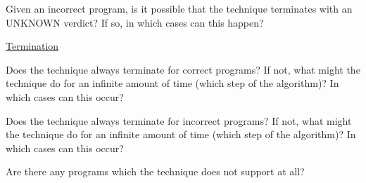 \documentclass[a4paper]{article}
\begin{document}
\begin{minipage}[t]{0.16\linewidth}
\begin{betterlist}
\begin{betterlist}
\begin{betterlist}
				\item Given an incorrect program, is it possible that the technique terminates with an UNKNOWN verdict? If so, in which cases can this happen?

			\end{betterlist}
			\item \underline{Termination}
			\begin{betterlist}
				\item Does the technique always terminate for correct programs? If not, what might the technique do for an infinite amount of time (which step of the algorithm)? In which cases can this occur?

				\item Does the technique always terminate for incorrect programs? If not, what might the technique do for an infinite amount of time (which step of the algorithm)? In which cases can this occur?

			\end{betterlist}
			\item Are there any programs which the technique does not support at all?


\end{betterlist}
\end{betterlist}
\end{minipage}
\end{document}

